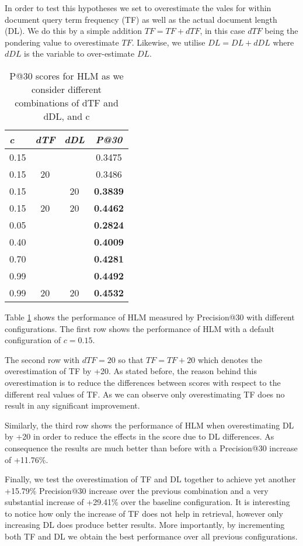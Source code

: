 In order to test this hypotheses we set to overestimate the vales for within document query term frequency (TF) as well as the actual document length (DL). We do this by a simple addition \(TF = TF+dTF\), in this case \(dTF\) being the pondering value to overestimate \(TF\). Likewise, we utilise \(DL = DL+dDL\) where \(dDL\) is the variable to over-estimate \(DL\).

\begin{table}[]

	\caption{P@30 scores for HLM as we consider different combinations of dTF and dDL, and c}
	\centering
	\begin{tabular}{l|c|c|c} 	
	\textit{\textbf{c}} & 
	\textit{\textbf{dTF}} & 
	\textit{\textbf{dDL}} & 
	\textit{\textbf{P@30}} 	
	\tabularnewline
	\hline
	0.15 &    &    & 0.3475\\
	0.15 & 20 &    & 0.3486\\
	0.15 &    & 20 & \textbf{0.3839} \\
	0.15 & 20 & 20 & \textbf{0.4462} \\
	\hline
	\hline
	0.05 &  &  & \textbf{0.2824} \\
	0.40 &  &  & \textbf{0.4009} \\
	0.70 &  &  & \textbf{0.4281} \\
	0.99 &  &  & \textbf{0.4492} \\
	\hline
    \hline
	0.99 & 20 & 20 & \textbf{0.4532} \\	
	\hline
	\end{tabular}
	\label{hlmOverestimates}
\end{table}

Table \ref{hlmOverestimates} shows the performance of HLM measured by Precision@30 with different configurations. The first row shows the performance of HLM with a default configuration of $c = 0.15$. 

The second row with $dTF = 20$ so that $TF = TF+20$ which denotes the overestimation of TF by +20. As stated before, the reason behind this overestimation is to reduce the differences between scores with respect to the different real values of TF. As we can observe only overestimating TF does no result in any significant improvement.

Similarly, the third row shows the performance of HLM when overestimating DL by +20 in order to reduce the effects in the score due to DL differences. As consequence the results are much better than before with a Precision@30 increase of +11.76\%. 

Finally, we test the overestimation of TF and DL together to achieve yet another +15.79\% Precision@30 increase over the previous combination and a very substantial increase of +29.41\% over the baseline configuration. It is interesting to notice how only the increase of TF does not help in retrieval, however only increasing DL does produce better results. More importantly, by incrementing both TF and DL we obtain the best performance over all previous configurations.

